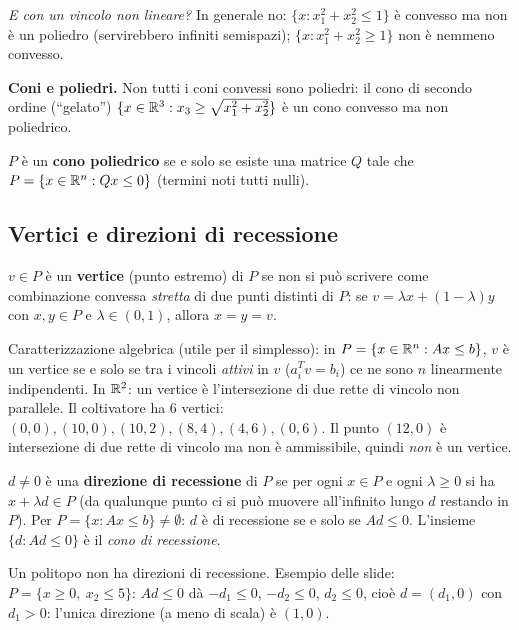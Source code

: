 \emph{E con un vincolo non lineare?} In generale no: $\{x: x_1^2+x_2^2\le1\}$ è convesso ma non è un poliedro (servirebbero infiniti semispazi); $\{x: x_1^2+x_2^2\ge1\}$ non è nemmeno convesso.

\textbf{Coni e poliedri.} Non tutti i coni convessi sono poliedri: il cono di secondo ordine (``gelato'') $\{x\in\mathbb{R}^3: x_3\ge\sqrt{x_1^2+x_2^2}\}$ è un cono convesso ma non poliedrico.
\begin{prop}
$P$ è un \textbf{cono poliedrico} se e solo se esiste una matrice $Q$ tale che $P=\{x\in\mathbb{R}^n: Qx\le0\}$ (termini noti tutti nulli).
\end{prop}

\subsection{Vertici e direzioni di recessione}
\begin{defbox}[vertice]
$v\in P$ è un \textbf{vertice} (punto estremo) di $P$ se non si può scrivere come combinazione convessa \emph{stretta} di due punti distinti di $P$: se $v=\lambda x+(1-\lambda)y$ con $x,y\in P$ e $\lambda\in(0,1)$, allora $x=y=v$.
\end{defbox}
Caratterizzazione algebrica (utile per il simplesso): in $P=\{x\in\mathbb{R}^n:Ax\le b\}$, $v$ è un vertice se e solo se tra i vincoli \emph{attivi} in $v$ ($a_i^Tv=b_i$) ce ne sono $n$ linearmente indipendenti. In $\mathbb{R}^2$: un vertice è l'intersezione di due rette di vincolo non parallele. Il coltivatore ha 6 vertici: $(0,0),(10,0),(10,2),(8,4),(4,6),(0,6)$. Il punto $(12,0)$ è intersezione di due rette di vincolo ma non è ammissibile, quindi \emph{non} è un vertice.

\begin{defbox}
$d\ne0$ è una \textbf{direzione di recessione} di $P$ se per ogni $x\in P$ e ogni $\lambda\ge0$ si ha $x+\lambda d\in P$ (da qualunque punto ci si può muovere all'infinito lungo $d$ restando in $P$). Per $P=\{x:Ax\le b\}\neq\emptyset$: $d$ è di recessione se e solo se $Ad\le0$. L'insieme $\{d: Ad\le0\}$ è il \emph{cono di recessione}.
\end{defbox}
Un politopo non ha direzioni di recessione. Esempio delle slide: $P=\{x\ge0,\ x_2\le5\}$: $Ad\le0$ dà $-d_1\le0$, $-d_2\le0$, $d_2\le0$, cioè $d=(d_1,0)$ con $d_1>0$: l'unica direzione (a meno di scala) è $(1,0)$.

